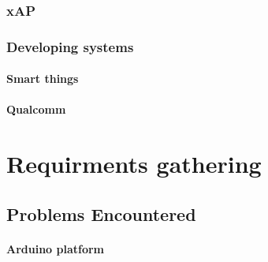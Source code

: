 \documentclass{l4proj}
\begin{document}

\subsection{xAP} %
\label{sub:xap}
\cite{xAP}

\subsection{Developing systems} %
\label{sub:developing_systems}

\subsubsection{Smart things} %
\label{ssub:smart_things}


\subsubsection{Qualcomm} %
\label{ssub:qualcomm}







\chapter{Requirments gathering} %
\label{cha:requirments_gathering}

\section{Problems Encountered} %
\label{sec:problems_encountered}

\subsubsection{Arduino platform} %
\label{ssub:arduino_platform}


\end{document}
